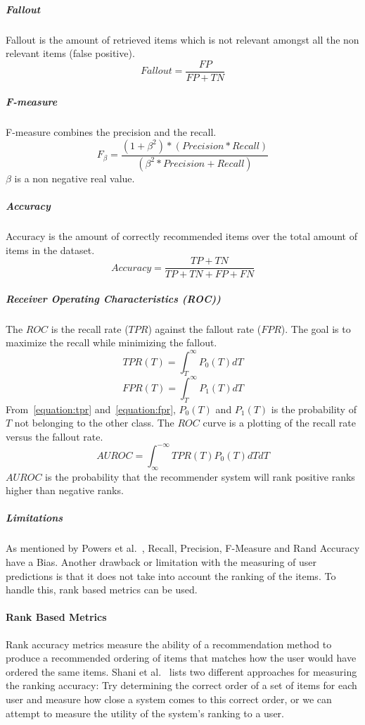 \subparagraph{Fallout}
Fallout is the amount of retrieved items which is not relevant amongst all the non relevant items (false positive).
\begin{equation}
    Fallout = \frac{FP}{FP+TN}
    \label{equation:fallout}
\end{equation}

\subparagraph{F-measure}
F-measure combines the precision and the recall.
\begin{equation}
    F_\beta = \frac{(1 + \beta^2) * (Precision * Recall)}{(\beta^2 * Precision + Recall)}
    \label{equation:f-measure}
\end{equation}
$\beta$ is a non negative real value.

\subparagraph{Accuracy}
Accuracy is the amount of correctly recommended items over the total amount of items in the dataset.
\begin{equation}
    Accuracy = \frac{TP+TN}{TP+TN+FP+FN}
    \label{equation:accuracy}
\end{equation}

\subparagraph{Receiver Operating Characteristics (ROC))}
The $ROC$ is the recall rate ($TPR$) against the fallout rate ($FPR$).
The goal is to maximize the recall while minimizing the fallout.
\begin{equation}
    TPR(T) = \int_T^\infty P_0(T)dT
    \label{equation:tpr}
\end{equation}
\begin{equation}
    FPR(T) = \int_T^\infty P_1(T)dT
    \label{equation:fpr}
\end{equation}
From~\ref{equation:tpr} and~\ref{equation:fpr}, $P_0(T)$ and $P_1(T)$ is the probability of $T$ not belonging to the other class.
The $ROC$ curve is a plotting of the recall rate versus the fallout rate.
\begin{equation}
    AUROC = \int_\infty^{-\infty} TPR(T)P_0(T)dTdT
    \label{equation:auroc}
\end{equation}
$AUROC$ is the probability that the recommender system will rank positive ranks higher than negative ranks.

\subparagraph{Limitations}
\label{subp:limitations}
As mentioned by Powers et al.~\cite{powers2007}, Recall, Precision, F-Measure and Rand Accuracy have a Bias.
Another drawback or limitation with the measuring of user predictions is that it does not take into account the ranking of the items.
To handle this, rank based metrics can be used.


\paragraph{Rank Based Metrics}
Rank accuracy metrics measure the ability of a recommendation method to produce
a recommended ordering of items that matches how the user would have ordered
the same items. Shani et al.~\cite{Shani2011} lists two different approaches
for measuring the ranking accuracy: Try determining the correct order of a set
of items for each user and measure how close a system comes to this correct
order, or we can attempt to measure the utility of the system's ranking to a
user.


